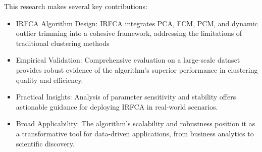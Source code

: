 \documentclass[twoside,11pt]{article}
\begin{document}
This research makes several key contributions:
    \begin{itemize}[nosep]
        \item IRFCA Algorithm Design: IRFCA integrates PCA, FCM, PCM, and dynamic outlier trimming into a cohesive framework, addressing the limitations of traditional clustering methods
        \item Empirical Validation: Comprehensive evaluation on a large-scale dataset provides robust evidence of the algorithm’s superior performance in clustering quality and efficiency.
        \item Practical Insights: Analysis of parameter sensitivity and stability offers actionable guidance for deploying IRFCA in real-world scenarios.
        \item Broad Applicability: The algorithm’s scalability and robustness position it as a transformative tool for data-driven applications, from business analytics to scientific discovery.
    \end{itemize}
\end{document}
